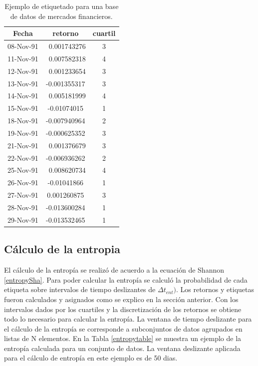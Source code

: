 \begin{table}
	\begin{center}
	\begin{tabular}{|c|c|c|}
		\hline 
		Fecha & retorno & cuartil \\ 
		\hline 
08-Nov-91	&	~0.001743276	&	3	\\
11-Nov-91	&	~0.007582318	&	4	\\
12-Nov-91	&	~0.001233654	&	3	\\
13-Nov-91	&	-0.001355317	&	3	\\
14-Nov-91	&	~0.005181999	&	4	\\
15-Nov-91	&	-0.01074015	&	1	\\
18-Nov-91	&	-0.007940964	&	2	\\
19-Nov-91	&	-0.000625352	&	3	\\
21-Nov-91	&	~0.001376679	&	3	\\
22-Nov-91	&	-0.006936262	&	2	\\
25-Nov-91	&	~0.008620734	&	4	\\
26-Nov-91	&	-0.01041866	&	1	\\
27-Nov-91	&	0.001260875	&	3	\\
28-Nov-91	&	-0.013600284	&	1	\\
29-Nov-91	&	-0.013532465	&	1	\\
		\hline 
	\end{tabular} 
	\label{ejemplo_data-returns}
	\caption{Ejemplo de etiquetado para una base de datos de mercados financieros.}
\end{center}
\end{table}

\subsection{Cálculo de la entropia}
\label{sec_entropia}
El cálculo de la entropía se realizó de acuerdo a la ecuación de Shannon \ref{entropySha}.
Para poder calcular la entropía se calculó la probabilidad de cada etiqueta sobre intervalos de tiempo deslizantes de $\Delta t_{ent})$.
Los retornos y etiquetas fueron calculados y asignados como se explico en la sección anterior. 
Con los intervalos dados por los cuartiles y la discretización de los retornos se obtiene todo lo necesario para calcular la entropía.
La ventana de tiempo deslizante para el cálculo de la entropía se corresponde a subconjuntos de datos agrupados en listas de N elementos.
En la Tabla \ref{entropytable} se muestra un ejemplo de la entropía calculada para un conjunto de datos. 
La ventana deslizante aplicada para el cálculo de entropía en este ejemplo es de 50 dias.

